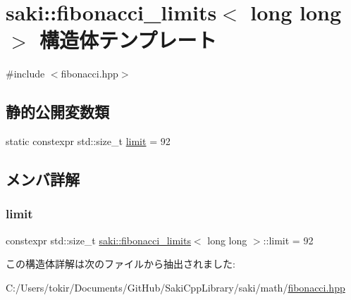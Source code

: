\hypertarget{structsaki_1_1fibonacci__limits_3_01long_01long_01_4}{}\section{saki\+:\+:fibonacci\+\_\+limits$<$ long long $>$ 構造体テンプレート}
\label{structsaki_1_1fibonacci__limits_3_01long_01long_01_4}


{\ttfamily \#include $<$fibonacci.\+hpp$>$}

\subsection*{静的公開変数類}
\begin{DoxyCompactItemize}
\item 
static constexpr std\+::size\+\_\+t \mbox{\hyperlink{structsaki_1_1fibonacci__limits_3_01long_01long_01_4_a46c10e09f0e4a8b8d557c9f2fa0cabd1}{limit}} = 92
\end{DoxyCompactItemize}


\subsection{メンバ詳解}
\mbox{\label{structsaki_1_1fibonacci__limits_3_01long_01long_01_4_a46c10e09f0e4a8b8d557c9f2fa0cabd1}} 
\subsubsection{\texorpdfstring{limit}{limit}}
{\footnotesize\ttfamily constexpr std\+::size\+\_\+t \mbox{\hyperlink{structsaki_1_1fibonacci__limits}{saki\+::fibonacci\+\_\+limits}}$<$ long long $>$\+::limit = 92\hspace{0.3cm}{\ttfamily [static]}}



この構造体詳解は次のファイルから抽出されました\+:\begin{DoxyCompactItemize}
\item 
C\+:/\+Users/tokir/\+Documents/\+Git\+Hub/\+Saki\+Cpp\+Library/saki/math/\mbox{\hyperlink{fibonacci_8hpp}{fibonacci.\+hpp}}\end{DoxyCompactItemize}
